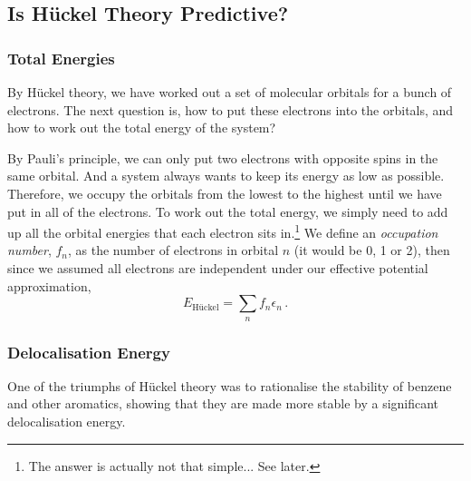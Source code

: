 \documentclass{article}
\theoremstyle{plain}\theoremheaderfont{\normalfont\itshape}\theorembodyfont{\rmfamily}\theoremseparator{.}\newtheorem*{rem}{Remark}\newtheorem*{ex}{Example}\newtheorem*{proof}{Proof}\newtheorem*{altp}{Alternative proof}
\theoremstyle{plain}\theoremheaderfont{\normalfont\bfseries}\theorembodyfont{\rmfamily}\theoremseparator{.}\newtheorem{thm}{Theorem}[section]\newtheorem{lem}[thm]{Lemma}\newtheorem{prop}[thm]{Proposition}\newtheorem*{cor}{Corollary}\newtheorem{defn}[thm]{Definition}\newtheorem{clm}[thm]{Claim}\newtheorem{clminproof}{Claim}\newtheorem{pos}{Postulate}[section]
\theoremstyle{break}\theoremheaderfont{\normalfont\itshape}\theorembodyfont{\rmfamily}\theoremseparator{.\medskip}\newtheorem*{proofskip}{Proof}\newtheorem*{exs}{Examples}\newtheorem*{rems}{Remarks}
\theoremstyle{break}\theoremheaderfont{\normalfont\bfseries}\theorembodyfont{\rmfamily}\theoremseparator{.\medskip}\newtheorem{lemskip}[thm]{Lemma}\newtheorem{defnskip}[thm]{Definition}\newtheorem{propskip}[thm]{Proposition}\newtheorem{thmskip}[thm]{Theorem}
\numberwithin{equation}{section}
\begin{document}
    \subsection{Is H\"{u}ckel Theory Predictive?}
    \subsubsection{Total Energies}
    By H\"{u}ckel theory, we have worked out a set of molecular orbitals for a bunch of electrons. The next question is, how to put these electrons into the orbitals, and how to work out the total energy of the system?

    By Pauli's principle, we can only put two electrons with opposite spins in the same orbital. And a system always wants to keep its energy as low as possible. Therefore, we occupy the orbitals from the lowest to the highest until we have put in all of the electrons. To work out the total energy, we simply need to add up all the orbital energies that each electron sits in.\footnote{The answer is actually not that simple... See later.} We define an \textit{occupation number}, \(f_n\), as the number of electrons in orbital \(n\) (it would be 0, 1 or 2), then since we assumed all electrons are independent under our effective potential approximation,
    \begin{equation}
        E_{\text{H\"{u}ckel}}=\sum_n f_n\epsilon_n\,.
    \end{equation}

    \subsubsection{Delocalisation Energy}
    One of the triumphs of H\"{u}ckel theory was to rationalise the stability of benzene and other aromatics, showing that they are made more stable by a significant delocalisation energy.
\end{document}
